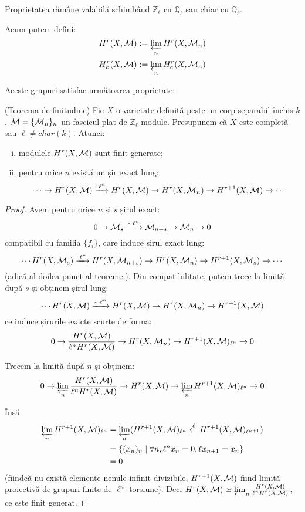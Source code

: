 \documentclass[13pt,openany]{book}
\begin{document}
\begin{obs}
Proprietatea rămâne valabilă schimbând $\mathbb{Z}_\ell$ cu $\mathbb{Q}_\ell$ sau chiar cu $\bar{\mathbb{Q}}_\ell$.
\end{obs}

Acum putem defini:
$$H^r(X,\mathcal{M}):=\varprojlim_n H^r(X,\mathcal{M}_n)$$
$$H^r_c(X,\mathcal{M}):=\varprojlim_n H^r_c(X,\mathcal{M}_n)$$

Aceste grupuri satisfac următoarea proprietate:

\begin{teo}
(Teorema de finitudine) Fie $X$ o varietate definită peste un corp separabil închis $k$. $\mathcal{M}=\{\mathcal{M}_n\}_n$ un fascicul plat de $\mathbb{Z}_\ell$-module. Presupunem că $X$ este completă sau $\ell \neq char(k)$. Atunci:
\begin{enumerate}[(i)]
\item modulele $H^r(X,\mathcal{M})$ sunt finit generate;
\item pentru orice $n$ există un șir exact lung:
$$\cdots \rightarrow H^r(X,\mathcal{M}) \xrightarrow{\cdot \ell^n} H^r(X,\mathcal{M}) \rightarrow H^r(X,\mathcal{M}_n) \rightarrow H^{r+1}(X,\mathcal{M}) \rightarrow \cdots$$
\end{enumerate}
\end{teo}

\begin{proof}
Avem pentru orice $n$ și $s$ șirul exact:
$$0 \rightarrow \mathcal{M}_s \xrightarrow{\cdot\ \ell^n} \mathcal{M}_{n+s} \rightarrow \mathcal{M}_n \rightarrow 0$$
compatibil cu familia $\{f_i\}$, care induce șirul exact lung:
$$\cdots H^r(X,\mathcal{M}_s) \xrightarrow{\cdot \ell^n} H^r(X,\mathcal{M}_{n+s}) \rightarrow H^r(X,\mathcal{M}_n) \rightarrow H^{r+1}(X,\mathcal{M}_s) \rightarrow \cdots$$
(adică al doilea punct al teoremei).
Din compatibilitate, putem trece la limită după $s$ și obținem șirul lung:
$$\cdots H^r(X,\mathcal{M}) \xrightarrow{\cdots \ell^n} H^r(X,\mathcal{M}) \rightarrow H^r(X,\mathcal{M}_n) \rightarrow H^{r+1}(X,\mathcal{M})$$
ce induce șirurile exacte scurte de forma:
$$0 \rightarrow \frac{H^r(X,\mathcal{M})}{\ell^n H^r(X,\mathcal{M})} \rightarrow H^r(X,\mathcal{M}_n) \rightarrow H^{r+1}(X,\mathcal{M})_{\ell^n} \rightarrow 0$$

Trecem la limită după $n$ și obținem:
$$0 \rightarrow \varprojlim_n \frac{H^r(X,\mathcal{M})}{\ell^n H^r(X,\mathcal{M})} \rightarrow H^r(X,\mathcal{M}) \rightarrow \varprojlim_n H^{r+1}(X,\mathcal{M})_{\ell^n} \rightarrow 0$$

Însă
\begin{align*}
\varprojlim_n H^{r+1}(X,\mathcal{M})_{\ell^n} &= \varprojlim_n (H^{r+1}(X,\mathcal{M})_{\ell^n} \xleftarrow{\ell} H^{r+1}(X,\mathcal{M})_{\ell^{n+1}})\\
&=\{(x_n)_n \mid \forall n, \ell^n x_n=0, \ell x_{n+1}=x_n\}\\
&=0
\end{align*}
(fiindcă nu există elemente nenule infinit divizibile, $H^{r+1}(X,\mathcal{M})$ fiind limită proiectivă de grupuri finite de $\ell^n$-torsiune). Deci $H^r(X,\mathcal{M})\simeq \varprojlim_n \frac{H^r(X,\mathcal{M})}{\ell^n H^r(X,\mathcal{M})}$, ce este finit generat.
\end{proof}
\end{document}
